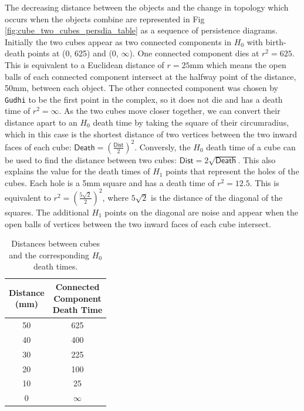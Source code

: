 \documentclass[ma]{uncgdissertationexp}
\theoremstyle{plain}
\theoremstyle{definition}
\theoremstyle{remark}
\begin{document}
\par The decreasing distance between the objects and the change in topology which occurs when the objects combine are represented in Fig \ref{fig:cube_two_cubes_persdia_table} as a sequence of persistence diagrams. Initially the two cubes appear as two connected components in $H_{0}$ with birth-death points at (0, 625) and (0, $\infty$). One connected component dies at $r^{2} = 625$. This is equivalent to a Euclidean distance of $r=25$mm which means the open balls of each connected component intersect at the halfway point of the distance, 50mm, between each object. The other connected component was chosen by \verb"Gudhi" to be the first point in the complex, so it does not die and has a death time of $r^2=\infty$. As the two cubes move closer together, we can convert their distance apart to an $H_{0}$ death time by taking the square of their circumradius, which in this case is the shortest distance of two vertices between the two inward faces of each cube: $\mathsf{Death}=(\frac{\mathsf{Dist}}{2})^2$. Conversly, the $H_{0}$ death time of a cube can be used to find the distance between two cubes: $\mathsf{Dist} = 2\sqrt{\mathsf{Death}}$. This also explains the value for the death times of $H_{1}$ points that represent the holes of the cubes. Each hole is a 5mm square and has a death time of $r^{2}=12.5$. This is equivalent to $r^{2}=(\frac{5\sqrt{2}}{2})^{2}$, where $5\sqrt{2}$ is the distance of the diagonal of the squares. The additional $H_{1}$ points on the diagonal are noise and appear when the open balls of vertices between the two inward faces of each cube intersect.
\begin{table}[H]
\centering
\begin{tabular}{|c|c|}
    \hline
    \makecell{Distance\\(mm)} & \makecell{Connected\\Component\\Death Time} \\
    \hline
    50 & 625 \\
    40 & 400 \\
    30 & 225 \\
    20 & 100 \\
    10 & 25 \\
    0 & $\infty$ \\
    \hline
\end{tabular}
\caption{Distances between cubes and the corresponding $H_{0}$ death times.}
\label{tab:two_cubes_death_times}
\end{table}
\end{document}

